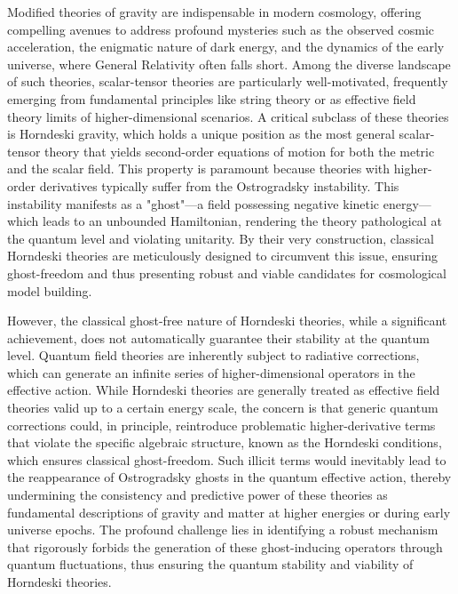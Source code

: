 \documentclass[twocolumn]{aastex631}
\begin{document}
Modified theories of gravity are indispensable in modern cosmology, offering compelling avenues to address profound mysteries such as the observed cosmic acceleration, the enigmatic nature of dark energy, and the dynamics of the early universe, where General Relativity often falls short. Among the diverse landscape of such theories, scalar-tensor theories are particularly well-motivated, frequently emerging from fundamental principles like string theory or as effective field theory limits of higher-dimensional scenarios. A critical subclass of these theories is Horndeski gravity, which holds a unique position as the most general scalar-tensor theory that yields second-order equations of motion for both the metric and the scalar field. This property is paramount because theories with higher-order derivatives typically suffer from the Ostrogradsky instability. This instability manifests as a "ghost"—a field possessing negative kinetic energy—which leads to an unbounded Hamiltonian, rendering the theory pathological at the quantum level and violating unitarity. By their very construction, classical Horndeski theories are meticulously designed to circumvent this issue, ensuring ghost-freedom and thus presenting robust and viable candidates for cosmological model building.

However, the classical ghost-free nature of Horndeski theories, while a significant achievement, does not automatically guarantee their stability at the quantum level. Quantum field theories are inherently subject to radiative corrections, which can generate an infinite series of higher-dimensional operators in the effective action. While Horndeski theories are generally treated as effective field theories valid up to a certain energy scale, the concern is that generic quantum corrections could, in principle, reintroduce problematic higher-derivative terms that violate the specific algebraic structure, known as the Horndeski conditions, which ensures classical ghost-freedom. Such illicit terms would inevitably lead to the reappearance of Ostrogradsky ghosts in the quantum effective action, thereby undermining the consistency and predictive power of these theories as fundamental descriptions of gravity and matter at higher energies or during early universe epochs. The profound challenge lies in identifying a robust mechanism that rigorously forbids the generation of these ghost-inducing operators through quantum fluctuations, thus ensuring the quantum stability and viability of Horndeski theories.
\end{document}
